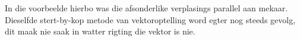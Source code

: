 In die voorbeelde hierbo was die afsonderlike verplasings parallel aan mekaar. Dieselfde stert-by-kop metode van vektoroptelling word egter nog steeds gevolg, dit maak nie saak in watter rigting die vektor is nie.






